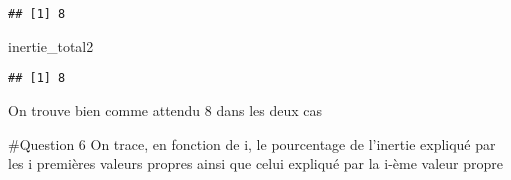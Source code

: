 \documentclass[
]{article}
\newenvironment{Shaded}{\begin{snugshade}}{\end{snugshade}}
\newcommand{\CommentTok}[1]{\textcolor[rgb]{0.56,0.35,0.01}{\textit{#1}}}
\newcommand{\ControlFlowTok}[1]{\textcolor[rgb]{0.13,0.29,0.53}{\textbf{#1}}}
\newcommand{\DecValTok}[1]{\textcolor[rgb]{0.00,0.00,0.81}{#1}}
\newcommand{\FunctionTok}[1]{\textcolor[rgb]{0.13,0.29,0.53}{\textbf{#1}}}
\newcommand{\NormalTok}[1]{#1}
\newcommand{\OtherTok}[1]{\textcolor[rgb]{0.56,0.35,0.01}{#1}}
\newcommand{\SpecialCharTok}[1]{\textcolor[rgb]{0.81,0.36,0.00}{\textbf{#1}}}
\begin{document}
\begin{Shaded}
\end{Shaded}

\begin{verbatim}
## [1] 8
\end{verbatim}

\begin{Shaded}
\begin{Highlighting}[]
\NormalTok{inertie\_total2}
\end{Highlighting}
\end{Shaded}

\begin{verbatim}
## [1] 8
\end{verbatim}

On trouve bien comme attendu 8 dans les deux cas

\#Question 6 On trace, en fonction de i, le pourcentage de l'inertie
expliqué par les i premières valeurs propres ainsi que celui expliqué
par la i-ème valeur propre
\end{document}
